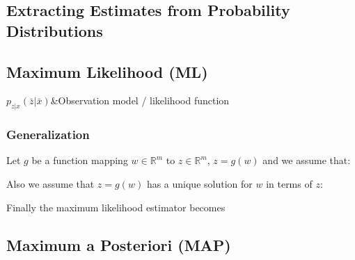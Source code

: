 \documentclass[10pt,a4paper]{scrartcl}
\begin{document}
\begin{multicols*}{2}
\section{Extracting Estimates from Probability Distributions}

\subsection{Maximum Likelihood (ML)}


\begin{TDefinitionTable*}
$p_{z|x}(\bar{z}|\bar{x})$&Observation model / likelihood function\\
\end{TDefinitionTable*}

\subsubsection{Generalization}


Let $g$ be a function mapping $w\in\mathbb{R}^m$ to $z\in\mathbb{R}^m$, $z=g(w)$ and we assume that: 


Also we assume that $z=g(w)$ has a unique solution for $w$ in terms of $z$:


Finally the maximum likelihood estimator becomes 


\subsection{Maximum a Posteriori (MAP)}


\end{multicols*}
\end{document}
